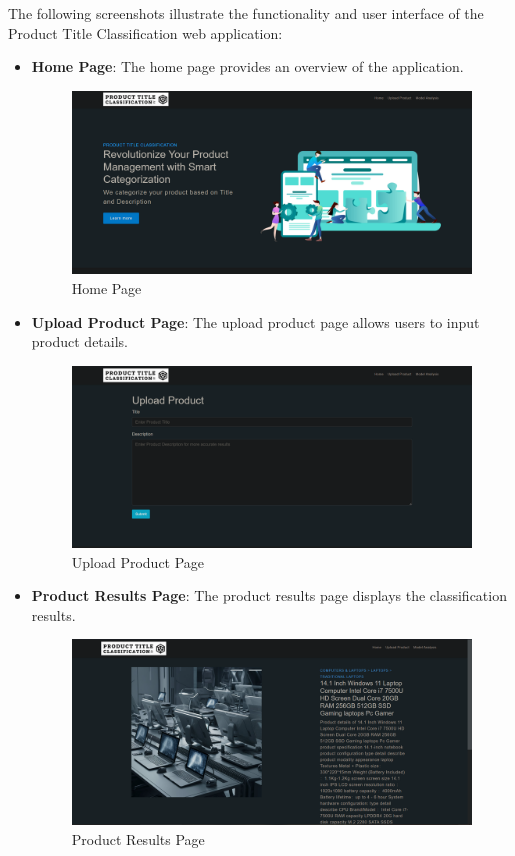 \documentclass[10pt]{article}
\begin{document}
The following screenshots illustrate the functionality and user interface of the Product Title Classification web application:

\begin{itemize}
    \item \textbf{Home Page}: The home page provides an overview of the application.
    \begin{figure}[H]
        \centering
        \includegraphics[width=1\textwidth]{homepage.png}
        \caption{Home Page}
    \end{figure}

    \item \textbf{Upload Product Page}: The upload product page allows users to input product details.
    \begin{figure}[H]
        \centering
        \includegraphics[width=1\textwidth]{productupload.png}
        \caption{Upload Product Page}
    \end{figure}

    \item \textbf{Product Results Page}: The product results page displays the classification results.
    \begin{figure}[H]
        \centering
        \includegraphics[width=1\textwidth]{productdisplay.png}
        \caption{Product Results Page}
    \end{figure}
\end{itemize}
\end{document}
